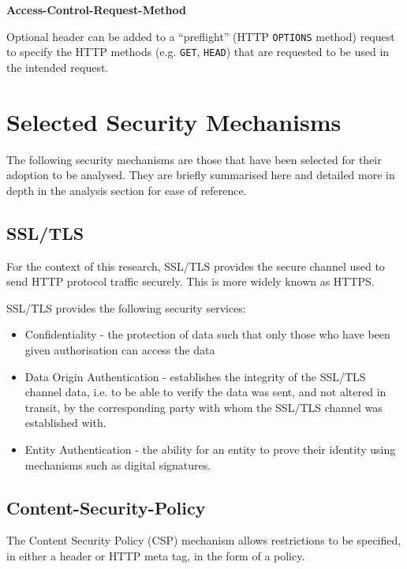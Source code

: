 \documentclass{mscreport}
\begin{document}
\vspace{0.7cm} \noindent
\textbf{Access-Control-Request-Method}

\vspace{0.3cm} \noindent
Optional header can be added to a ``preflight'' (HTTP \texttt{OPTIONS} method) request to specify the HTTP methods (e.g. \texttt{GET}, \texttt{HEAD}) that are requested to be used in the intended request.

\newpage

\section{Selected Security Mechanisms}

The following security mechanisms are those that have been selected for their adoption to be analysed. They are briefly summarised here and detailed more in depth in the analysis section for ease of reference.


\subsection{SSL/TLS}
For the context of this research, SSL/TLS provides the secure channel used to send HTTP protocol traffic securely. This is more widely known as HTTPS.

\vspace{0.3cm} \noindent
SSL/TLS provides the following security services:

\begin{itemize}
	\setlength\itemsep{0.1em}
	\item Confidentiality - the protection of data such that only those who have been given authorisation can access the data
	\item Data Origin Authentication - establishes the integrity of the SSL/TLS channel data, i.e. to be able to verify the data was sent, and not altered in transit, by the corresponding party with whom the SSL/TLS channel was established with.
	\item Entity Authentication - the ability for an entity to prove their identity using mechanisms such as digital signatures.

\end{itemize}


\subsection{Content-Security-Policy}
The Content Security Policy (CSP) mechanism allows restrictions to be specified, in either a header or HTTP meta tag, in the form of a policy.
\end{document}

